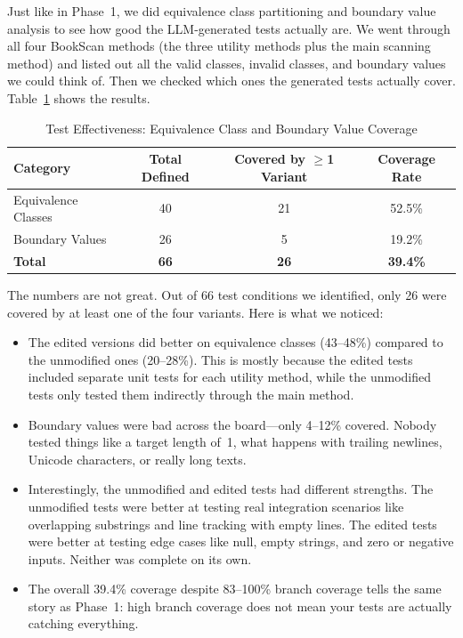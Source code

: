 \documentclass[12pt, a4paper]{article}
\begin{document}
Just like in Phase~1, we did equivalence class partitioning and boundary value analysis to see how good the LLM-generated tests actually are. We went through all four BookScan methods (the three utility methods plus the main scanning method) and listed out all the valid classes, invalid classes, and boundary values we could think of. Then we checked which ones the generated tests actually cover. Table~\ref{tab:test-effectiveness} shows the results.

\begin{table}[H]
\centering
\caption{Test Effectiveness: Equivalence Class and Boundary Value Coverage}
\label{tab:test-effectiveness}
\begin{tabularx}{\textwidth}{l c c c}
\toprule
\textbf{Category} & \textbf{Total Defined} & \textbf{Covered by $\geq$1 Variant} & \textbf{Coverage Rate} \\
\midrule
Equivalence Classes & 40 & 21 & 52.5\% \\
Boundary Values     & 26 & 5  & 19.2\% \\
\midrule
\textbf{Total}      & \textbf{66} & \textbf{26} & \textbf{39.4\%} \\
\bottomrule
\end{tabularx}
\end{table}

The numbers are not great. Out of 66 test conditions we identified, only 26 were covered by at least one of the four variants. Here is what we noticed:
\begin{itemize}
    \item The edited versions did better on equivalence classes (43--48\%) compared to the unmodified ones (20--28\%). This is mostly because the edited tests included separate unit tests for each utility method, while the unmodified tests only tested them indirectly through the main method.
    \item Boundary values were bad across the board---only 4--12\% covered. Nobody tested things like a target length of~1, what happens with trailing newlines, Unicode characters, or really long texts.
    \item Interestingly, the unmodified and edited tests had different strengths. The unmodified tests were better at testing real integration scenarios like overlapping substrings and line tracking with empty lines. The edited tests were better at testing edge cases like null, empty strings, and zero or negative inputs. Neither was complete on its own.
    \item The overall 39.4\% coverage despite 83--100\% branch coverage tells the same story as Phase~1: high branch coverage does not mean your tests are actually catching everything.
\end{itemize}
\end{document}

